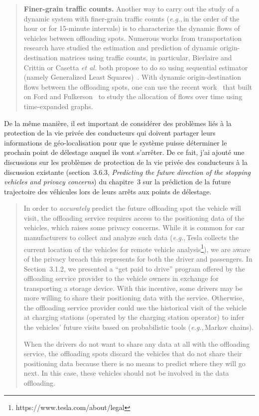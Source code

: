 \documentclass[11pt]{article}
\newcommand{\eg}{\textit{e.g.},\,}
\newcommand{\etal}{\textit{et al.}\xspace}
\begin{document}
\begin{quote}
\noindent\textbf{Finer-grain traffic counts.}
Another way to carry out the study of a dynamic system with finer-grain traffic counts (\eg in the order of the hour or for 15-minute intervals) is to characterize the dynamic flows of vehicles between offloading spots. Numerous works from transportation research have studied the estimation and prediction of dynamic origin-destination matrices using traffic counts, in particular, Bierlaire and Crittin or Casetta \etal both propose to do so using sequential estimator (namely Generalized Least Squares)~\cite{bierlaire2004efficient,cascetta1993dynamic}. With dynamic origin-destination flows between the offloading spots, one can use the recent work~\cite{fleischer2007quickest} that built on Ford and Fulkerson~\cite{ford2015flows} to study the allocation of flows over time using time-expanded graphs. 
\end{quote}

De la même manière, il est important de considérer des problèmes liés à la protection de la vie privée des conducteurs qui doivent partager leurs informations de géo-localisation pour que le système puisse déterminer le prochain point de délestage auquel ils vont s'arrêter. De ce fait, j'ai ajouté une discussions sur les problèmes de protection de la vie privée des conducteurs à la discussion existante (section~3.6.3, \textit{Predicting the future direction of the stopping vehicles and privacy concerns}) du chapitre~3 sur la prédiction de la future trajectoire des véhicules lors de leurs arrêts aux points de délestage.

\begin{quote}
In order to \textit{accurately} predict the future offloading spot the vehicle will visit, the offloading service requires access to the positioning data of the vehicles, which raises some privacy concerns. While it is common for car manufacturers to collect and analyze such data (\eg Tesla collects the current location of the vehicles for remote vehicle analysis\footnote{https://www.tesla.com/about/legal}), we are aware of the privacy breach this represents for both the driver and passengers. In Section~3.1.2, we presented a ``get paid to drive'' program offered by the offloading service provider to the vehicle owners in exchange for transporting a storage device. With this incentive, some drivers may be more willing to share their positioning data with the service.  Otherwise, the offloading service provider could use the historical visit of the vehicle at charging stations (operated by the charging station operator) to infer the vehicles' future visits based on probabilistic tools (\eg Markov chains).

When the drivers do not want to share any data at all with the offloading service, the offloading spots discard the vehicles that do not share their positioning data because there is no means to predict where they will go next. In this case, these vehicles should not be involved in the data offloading.
\end{quote}
\end{document}
